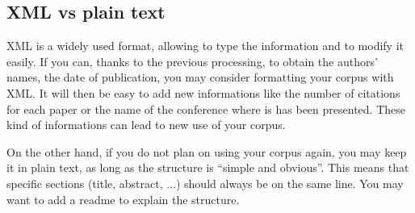 \documentclass[a4paper,10pt]{article}
\begin{document}
\subsection{XML vs plain text}
\label{sec:xml}

XML is a widely used format, allowing to type the information and to
modify it easily. If you can, thanks to the previous processing, to
obtain the authors' names, the date of publication, you may consider
formatting your corpus with XML. It will then be easy to add new
informations like the number of citations for each paper or the
name of the conference where is has been presented. These kind of
informations can lead to new use of your corpus.

On the other hand, if you do not plan on using your corpus again, you
may keep it in plain text, as long as the structure is ``simple and
obvious''. This means that specific sections (title, abstract, ...)
should always be on the same line. You may want to add a readme to
explain the structure.
\end{document}

